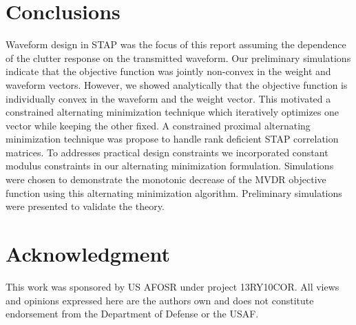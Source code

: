 \documentclass[11pt,draftclsnofoot,onecolumn]{IEEEtran}
\theoremstyle{definition}
\theoremstyle{remark}
\begin{document}
\section{Conclusions}
Waveform design in STAP was the focus of this report assuming the dependence of the clutter response on the transmitted waveform. Our preliminary simulations indicate that the objective function was jointly non-convex in the weight and waveform vectors. However, we showed analytically that the objective function is individually convex in the waveform and the weight vector. This motivated a constrained alternating minimization technique which iteratively optimizes one vector while keeping the other fixed. 
A constrained proximal alternating minimization technique was propose to handle rank deficient STAP correlation matrices. To addresses practical design constraints we incorporated constant modulus constraints in our alternating minimization formulation. Simulations were chosen to demonstrate the monotonic decrease  of the MVDR objective function using this alternating minimization algorithm. Preliminary simulations were presented to validate the theory.

\appendices










\section*{Acknowledgment}
This work was sponsored by US AFOSR under project 13RY10COR. All views and opinions expressed here are the authors own and does not constitute endorsement from the Department of Defense or the USAF. 




\ifCLASSOPTIONcaptionsoff
  \newpage
\fi














\end{document}
